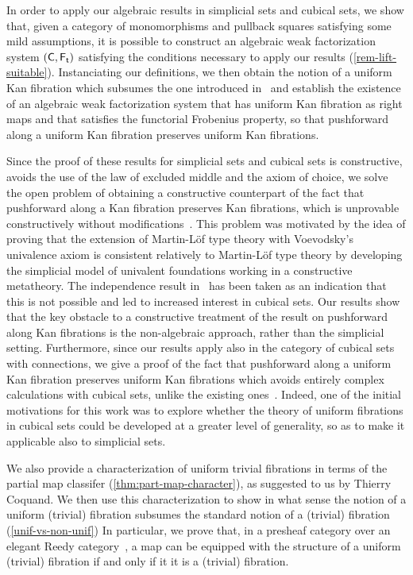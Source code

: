 \documentclass[reqno,10pt,a4paper,oneside,draft]{amsart}
\begin{document}
In order to apply our algebraic results in simplicial sets and cubical sets, we show that, given a category of monomorphisms and 
pullback squares  satisfying some mild assumptions, it is possible to construct an algebraic weak factorization system $(\mathsf{C}, \mathsf{F_t})$ satisfying the conditions
necessary to apply our results (\cref{rem-lift-suitable}). Instanciating our definitions, we then obtain the notion of a uniform Kan fibration which
subsumes the one introduced in~\cite{cohen-et-al:cubicaltt} and establish  the existence of an algebraic weak factorization system that has uniform Kan fibration as right maps and that satisfies the functorial Frobenius property, 
so that pushforward along a uniform Kan fibration preserves uniform  Kan fibrations. 



Since the proof of these results for simplicial sets and cubical sets is constructive, \ie avoids the use of the law of excluded middle and the axiom of choice, we solve the open problem of obtaining a constructive counterpart of the fact that pushforward along a Kan fibration preserves Kan fibrations, which is unprovable constructively without modifications~\cite{coquand-non-constructivity-kan}.  This problem was motivated by the idea of proving that the extension of Martin-L\"of type theory with Voevodsky's univalence axiom is consistent relatively to Martin-L\"of type theory by developing
the simplicial model of univalent foundations working in a constructive metatheory. The independence result in~\cite{coquand-non-constructivity-kan} has been taken as an indication that this
is not possible and led to increased interest in cubical sets. Our results show that the key obstacle to a constructive treatment of the result on pushforward along Kan fibrations is the 
non-algebraic approach, rather than the simplicial setting. Furthermore, since our results apply also in the category of cubical sets with connections,
we give a proof of the fact that pushforward along a uniform Kan fibration preserves uniform Kan fibrations which avoids entirely complex calculations with cubical sets, unlike the
existing ones~\cite{cohen-et-al:cubicaltt,huber-thesis}. Indeed, one of the initial motivations for this work was to explore whether the theory of uniform fibrations in cubical sets could be developed at a greater level of generality, so as to make it applicable also to simplicial sets.

We also provide a characterization of uniform trivial fibrations in terms of the partial map classifer (\cref{thm:part-map-character}), as suggested to us by Thierry Coquand. 
We then use this characterization to show in what sense the notion of a uniform (trivial) fibration subsumes the standard notion of a (trivial) fibration  (\cref{unif-vs-non-unif})
In particular, we prove that, in a presheaf category over an elegant Reedy category~\cite{bergner-rezk-elegant}, a map can be equipped with the structure of a uniform (trivial) fibration if and only if it it is a (trivial) fibration.
\end{document}
